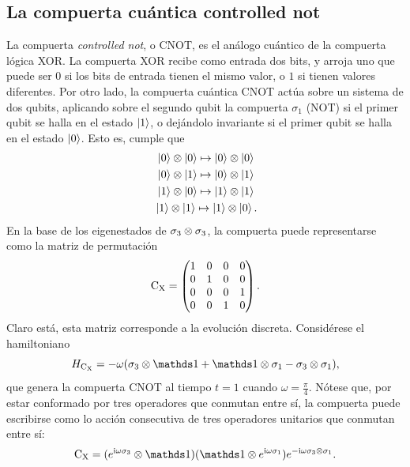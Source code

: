\subsection{La compuerta cuántica controlled not}

La compuerta \textit{controlled not}, o CNOT, es el análogo cuántico de la compuerta lógica XOR. La compuerta XOR recibe como entrada dos bits, y arroja uno que puede ser $0$ si los bits de entrada tienen el mismo valor, o $1$ si tienen valores diferentes. Por otro lado, la compuerta cuántica CNOT actúa sobre un sistema de dos qubits, aplicando sobre el segundo qubit la compuerta $\sigma_{1}$ (NOT) si el primer qubit se halla en el estado $\ket{1}$, o dejándolo invariante si el primer qubit se halla en el estado $\ket{0}$. Esto es, cumple que \cite{Chuang}
\begin{align*}
    \ket{0}\otimes\ket{0}\mapsto\ket{0}\otimes\ket{0}\\
    \ket{0}\otimes\ket{1}\mapsto\ket{0}\otimes\ket{1}\\
    \ket{1}\otimes\ket{0}\mapsto\ket{1}\otimes\ket{1}\\
    \ket{1}\otimes\ket{1}\mapsto\ket{1}\otimes\ket{0} \rlap{.}
\end{align*}
En la base de los eigenestados de $\sigma_{3}\otimes\sigma_{3}$, la compuerta puede representarse como la matriz de permutación
\begin{equation*}
    \text{C}_{\text{X}}=\begin{pmatrix}
        1&0&0&0\\
        0&1&0&0\\
        0&0&0&1\\
        0&0&1&0
    \end{pmatrix}.
\end{equation*}
Claro está, esta matriz corresponde a la evolución discreta. Considérese el hamiltoniano
\begin{equation*}
  H_{\cnot}=-\omega(\pauli{3}\otimes\Id+\Id\otimes\pauli{1}-\pauli{3}\otimes\pauli{1}),
\end{equation*}
que genera la compuerta CNOT al tiempo $t=1$ cuando $\omega=\frac{\pi}{4}$. Nótese que, por estar conformado por tres operadores que conmutan entre sí, la compuerta puede escribirse como lo acción consecutiva de tres operadores unitarios que conmutan entre sí:
\begin{equation*}
  \cnot=(e^{\rmi\omega\pauli{3}}\otimes \Id) (\Id \otimes e^{\rmi\omega\pauli{1}}) e^{-\rmi\omega\pauli{3}\otimes\pauli{1}}.
\end{equation*}

